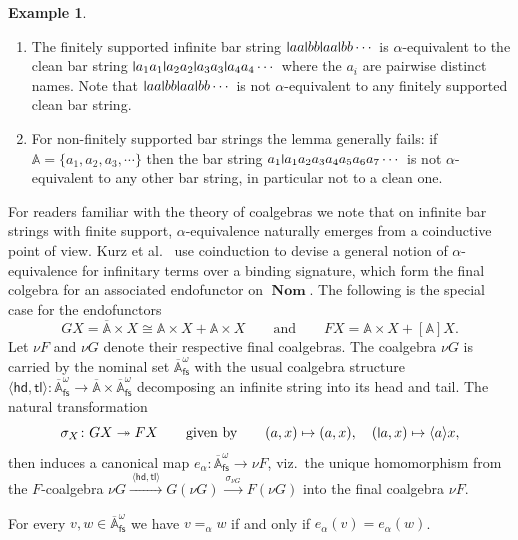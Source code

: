 \documentclass[final,a4paper,UKenglish,thm-restate,autoref,numberwithinsect]{lipics-v2021}
\newcommand{\midmid}{\hspace{0.2ex}{\rule[-0.1ex]{0.6pt}{1.65ex}}\hspace{0.2ex}}
\newcommand{\newletter}[1]{{\midmid}#1}
\newcommand{\barA}{\overline{\names}}
\numberwithin{equation}{section}
\newcommand{\xto}[1]{\xrightarrow{~#1~}}
\newcommand{\fs}{\mathsf{fs}}
\newcommand{\+}[1]{\mathcal{#1}\xspace}
\DeclareMathOperator{\Nom}{\mathbf{Nom}}
\newcommand{\names}{\mathbb{A}}
\theoremstyle{definition}
\newtheorem{expl}[theorem]{Example}
\begin{document}
\begin{expl}
\begin{enumerate}
\item The finitely supported infinite bar string $\newletter aa\newletter bb\newletter aa\newletter bb\cdots$
  is $\alpha$-equivalent to the clean bar string
  $\newletter a_1a_1\newletter a_2a_2\newletter a_3a_3\newletter a_4a_4\cdots$ where the $a_i$ are pairwise
  distinct names. Note that $\newletter aa\newletter bb\newletter aa\newletter bb\cdots$ is not $\alpha$-equivalent to any finitely supported clean bar string.
  
\item For non-finitely supported bar
  strings the lemma generally fails: if $\names = \{a_1,a_2,a_3,\cdots\}$ then the bar string
  $a_1\newletter a_1a_2a_3a_4a_5a_6a_7\cdots$ is not $\alpha$-equivalent to any other bar string, in particular not to a clean one.
\end{enumerate}
\end{expl}

\noindent For readers familiar with the theory of coalgebras we note that on infinite bar strings with finite support, $\alpha$-equivalence
naturally emerges from a coinductive point of view. Kurz et
al.~\cite{kpsv13} use coinduction to devise a general notion of
$\alpha$-equivalence for infinitary terms over a binding signature,
which form the final colgebra for an associated endofunctor on $\Nom$.
The following is the special case for the endofunctors
\[
  GX = \barA\times X \cong \names \times X + \names \times X
  \qquad\text{and}\qquad
  FX = \names\times X + [\names]X.
\]
Let $\nu F$ and $\nu G$ denote their respective final coalgebras.
The coalgebra $\nu G$ is carried by the nominal set
$\barA^\omega_\fs$ 
with the usual coalgebra structure
$\langle \mathsf{hd},\mathsf{tl}\rangle\colon \barA^\omega_\fs \to
\barA \times \barA^\omega_\fs$ decomposing an infinite string into its
head and tail. The natural transformation
\[
  \sigma_X\colon GX\twoheadrightarrow FX\qquad\text{given by}\qquad
  (a,x) \mapsto (a,x),\quad (\newletter {a},x) \mapsto \langle
  a\rangle x,
\]
then induces a canonical map $e_\alpha\colon \barA^\omega_\fs \to \nu F$,
viz.~the unique
homomorphism from the $F$-coalgebra
$\nu G \xto{\langle \mathsf{hd},\mathsf{tl}\rangle} G(\nu G)
\xto{\sigma_{\nu G}} F(\nu G)$ into the final coalgebra $\nu F$.
%
\begin{proposition}\label{lem:alpha-equiv-coalgebraic}
  For every $v,w\in \barA^\omega_\fs$ we have $v=_\alpha w$ if and
  only if $e_\alpha(v)=e_\alpha(w)$.
\end{proposition}
%
%
\end{document}
